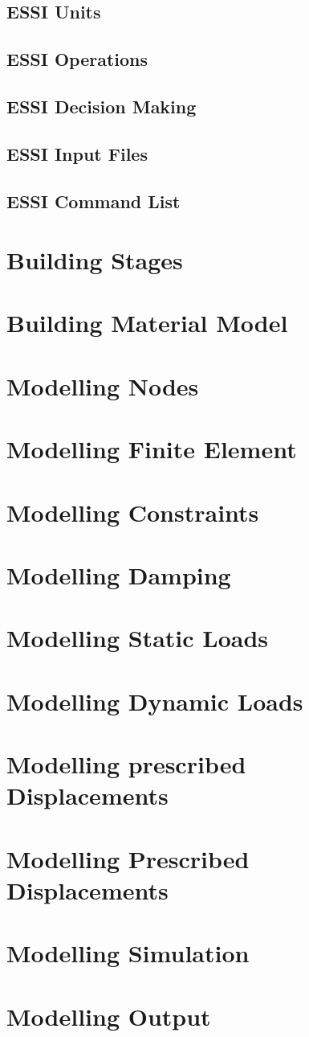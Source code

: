 \documentclass{article}
\begin{document}
\subsection{ESSI Units}

\subsection{ESSI Operations}

\subsection{ESSI Decision Making}

\subsection{ESSI Input Files}

\subsection{ESSI Command List}

\section {Building Stages}
\section {Building Material Model}
\section {Modelling Nodes}
\section {Modelling Finite Element}
\section {Modelling Constraints}
\section {Modelling Damping}
\section {Modelling Static Loads}
\section {Modelling Dynamic Loads}
\section {Modelling prescribed Displacements}
\section {Modelling Prescribed Displacements}
\section {Modelling Simulation}
\section {Modelling Output}
\end{document}
